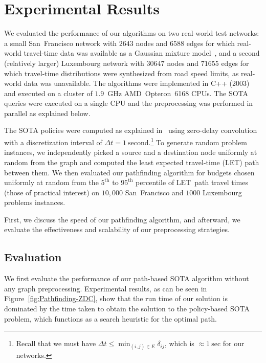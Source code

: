 \documentclass[oribibl]{llncs}
\begin{document}
	\section{Experimental Results}

			We evaluated the performance of our algorithms on two real-world test networks: a small San~Francisco
			network with $2643$ nodes and $6588$ edges for which real-world travel-time data was
			available as a Gaussian mixture model~\citep{hunter2013path}, and a second (relatively larger)
			Luxembourg network with $30647$ nodes and $71655$ edges for which travel-time distributions
			were synthesized from road speed limits, as real-world data was unavailable.
			The algorithms were implemented in C++ (2003) and executed on a cluster of
			$1.9$~GHz AMD~Opteron\texttrademark~6168 CPUs. The SOTA queries were executed on a single CPU
			and the preprocessing was performed in parallel as explained below.

			The SOTA policies were computed as explained in~\cite{samaranayake2012tractable,samaranayake2012speedup}
			using zero-delay convolution with a discretization interval of
			$\Delta t = 1\ \mathrm{second}$.\footnote
			{
				Recall that we must have $\Delta t \leq \min_{(i,j)\in E} \delta_{ij}$, which is
				$\approx 1~\mathrm{sec}$ for our networks.
			}
			To generate random problem instances, we independently picked a source and a destination node
			uniformly at random from the graph
			and computed the least expected travel-time (LET) path between them.
			We then evaluated our pathfinding algorithm
			for budgets chosen uniformly at random from the $5^\mathrm{th}$ to $95^\mathrm{th}$
			percentile of LET~path travel times (those of practical interest) on
			$10,000$ San~Francisco and $1000$ Luxembourg problems instances.

			First, we discuss the speed of our pathfinding algorithm, and afterward,
			we evaluate the effectiveness and scalability of our preprocessing strategies.

		\subsection{Evaluation}

			We first evaluate the performance of our path-based SOTA algorithm without any graph preprocessing.
			Experimental results, as can be seen in Figure~\ref{fig:Pathfinding-ZDC}, show that the run time of
			our solution is dominated by the time taken to obtain the solution to the policy-based SOTA problem,
			which functions as a search heuristic for the optimal path.
\end{document}
